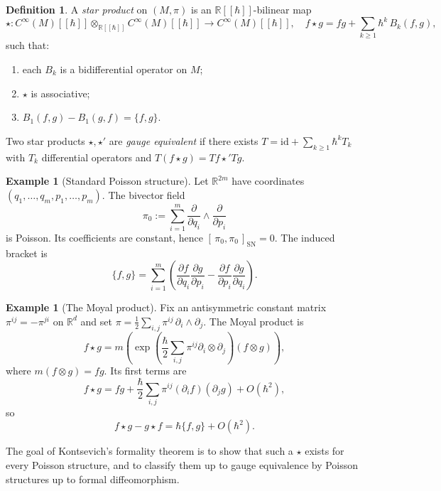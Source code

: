 \documentclass[11pt,a4paper]{article}
\theoremstyle{definition}
\newtheorem{definition}[theorem]{Definition}
\newtheorem{example}[theorem]{Example}
\newcommand{\R}{\mathbb{R}}
\newcommand{\Cinfty}{C^{\infty}}
\newcommand{\Sch}[2]{[\,#1,#2\,]_{\mathrm{SN}}}
\newcommand{\defi}[1]{\emph{#1}}
\begin{document}
\begin{definition}\label{def:star}
A \defi{star product} on $(M,\pi)$ is an $\R[[\hbar]]$-bilinear map
\[
\star \colon \Cinfty(M)[[\hbar]] \otimes_{\R[[\hbar]]} \Cinfty(M)[[\hbar]]
\longrightarrow \Cinfty(M)[[\hbar]],
\quad
f \star g = fg + \sum_{k \ge 1} \hbar^{k}\, B_{k}(f,g),
\]
such that:
\begin{enumerate}[label=(\roman*),leftmargin=2em]
  \item each $B_{k}$ is a bidifferential operator on $M$;
  \item $\star$ is associative;
  \item $B_{1}(f,g) - B_{1}(g,f) = \{f,g\}$.
\end{enumerate}
Two star products $\star, \star'$ are \defi{gauge equivalent} if there
exists $T = \mathrm{id} + \sum_{k\ge 1}\hbar^{k} T_{k}$ with $T_{k}$
differential operators and $T(f \star g) = T f \star' T g$.
\end{definition}

\begin{example}[Standard Poisson structure]
\label{ex:standard-poisson}
Let $\R^{2m}$ have coordinates
$(q_1,\dots,q_m,p_1,\dots,p_m)$. The bivector field
\[
\pi_0 := \sum_{i=1}^{m}
\frac{\partial}{\partial q_i}\wedge
\frac{\partial}{\partial p_i}
\]
is Poisson. Its coefficients are constant, hence
$\Sch{\pi_0}{\pi_0}=0$. The induced bracket is
\[
\{f,g\}
=\sum_{i=1}^{m}
\left(
\frac{\partial f}{\partial q_i}\frac{\partial g}{\partial p_i}
-\frac{\partial f}{\partial p_i}\frac{\partial g}{\partial q_i}
\right).
\]
\end{example}

\begin{example}[The Moyal product]
\label{ex:moyal-background}
Fix an antisymmetric constant matrix $\pi^{ij}=-\pi^{ji}$ on $\R^d$
and set
$\pi = \tfrac{1}{2}\sum_{i,j}\pi^{ij}\,\partial_i\wedge\partial_j$.
The Moyal product is
\[
f\star g
=m\left(
\exp\left(
\frac{\hbar}{2}\sum_{i,j}\pi^{ij}\partial_i\otimes\partial_j
\right)(f\otimes g)
\right),
\]
where $m(f\otimes g)=fg$. Its first terms are
\[
f\star g
=fg+\frac{\hbar}{2}\sum_{i,j}\pi^{ij}(\partial_i f)(\partial_j g)
+O(\hbar^2),
\]
so
\[
f\star g-g\star f=\hbar\{f,g\}+O(\hbar^2).
\]
\end{example}

The goal of Kontsevich's formality theorem is to show that such a
$\star$ exists for every Poisson structure, and to classify them up to
gauge equivalence by Poisson structures up to formal diffeomorphism.
\end{document}
